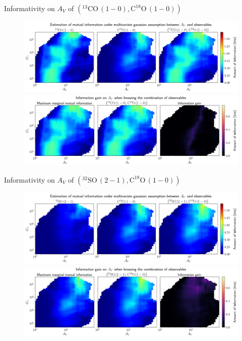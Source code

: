 \documentclass{beamer}
\begin{document}
\begin{frame}{Informativity on $A_V$ of $\left(\mathrm{^{13}CO\,(1-0)},\mathrm{C^{18}O\,(1-0)}\right)$}
    \begin{figure}
        \centering
        \includegraphics[width=0.95\linewidth]{../linearinfogauss/av__13co10_c18o10_linearinfogauss.png}
        \vfill
        \includegraphics[width=0.95\linewidth]{../linearinfogauss/av__13co10_c18o10_linearinfogauss_gain.png}
    \end{figure}
\end{frame}

\begin{frame}{Informativity on $A_V$ of $\left(\mathrm{^{32}SO\,(2-1)},\mathrm{C^{18}O\,(1-0)}\right)$}
    \begin{figure}
        \centering
        \includegraphics[width=0.95\linewidth]{../linearinfogauss/av__32so21_c18o10_linearinfogauss.png}
        \vfill
        \includegraphics[width=0.95\linewidth]{../linearinfogauss/av__32so21_c18o10_linearinfogauss_gain.png}
    \end{figure}
\end{frame}
\end{document}
